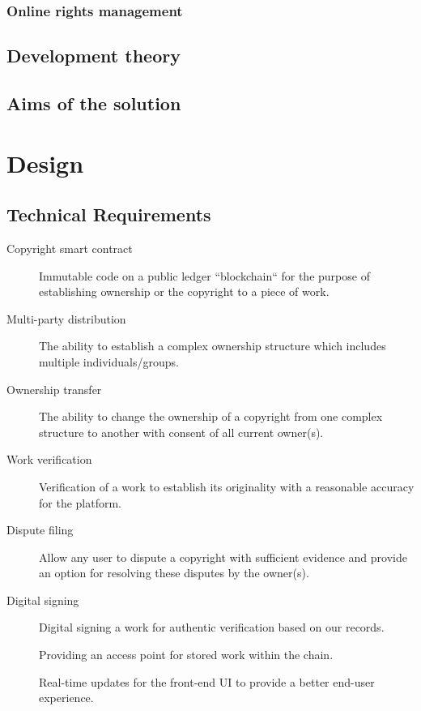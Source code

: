 \documentclass[12pt]{article}
\begin{document}
\subsubsection{Online rights management}

\subsection{Development theory}

\subsection{Aims of the solution}

\section{Design}

\subsection{Technical Requirements}

\begin{description}
	\item[Copyright smart contract] Immutable code on a public ledger “blockchain“ for the purpose of establishing ownership or the copyright to a piece of work.
	\item[Multi-party distribution] The ability to establish a complex ownership structure which includes multiple individuals/groups.
	\item[Ownership transfer] The ability to change the ownership of a copyright from one complex structure to another with consent of all current owner(s).
	\item[Work verification] Verification of a work to establish its originality with a reasonable accuracy for the platform.
	\item[Dispute filing] Allow any user to dispute a copyright with sufficient evidence and provide an option for resolving these disputes by the owner(s).
	\item[Digital signing] Digital signing a work for authentic verification based on our records.
	\item[\color{orange}{Decentralised Work CDN & proxy}] Providing an access point for stored work within the chain.
	\item[\color{orange}{Web-socket updates}] Real-time updates for the front-end UI to provide a better end-user experience.
\end{description}
\end{document}
